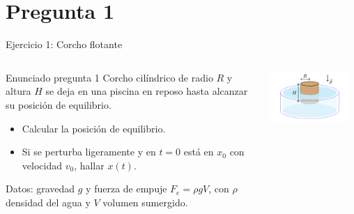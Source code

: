 \documentclass[
    10pt,
    aspectratio=169,
    xcolor={dvipsnames},
    spanish,
    ]{beamer}
\begin{document}
\section{Pregunta 1}

\begin{frame}{Ejercicio 1: Corcho flotante}
  \begin{columns}[T,totalwidth=\textwidth]
    \begin{column}{0.60\textwidth}
      \begin{block}{Enunciado pregunta 1}
        Corcho cilíndrico de radio $R$ y altura $H$ se deja en una piscina en reposo hasta alcanzar su posición de equilibrio.
        \begin{itemize}
          \item Calcular la posición de equilibrio.
          \item Si se perturba ligeramente y en $t=0$ está en $x_0$ con velocidad $v_0$, hallar $x(t)$.
        \end{itemize}
        Datos: gravedad $g$ y fuerza de empuje $F_e=\rho g V$, con $\rho$ densidad del agua y $V$ volumen sumergido.
      \end{block}
    \end{column}
    \begin{column}{0.40\textwidth}
      \centering
       \vspace*{1cm}
      \includegraphics[width=0.9\textwidth]{Auxiliar_1_1 copy.png}
    \end{column}
  \end{columns}
\end{frame}
\end{document}
